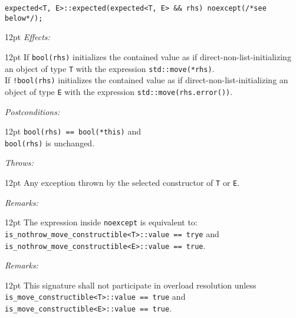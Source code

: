 \documentclass[a4paper,10pt]{article}
\newcommand{\cpp}[1]{\lstinline{#1}}
\newcommand{\wordingItem}[1]{\noindent\textit{#1:}}
\newenvironment{wordingTextItem}[1]{\wordingItem{#1}\vspace{7pt}\noindent\begin{adjustwidth}{12pt}{}}{\vspace{7pt}\end{adjustwidth}}
\newenvironment{wordingPara}{\begin{adjustwidth}{12pt}{}}{\end{adjustwidth}}
\begin{document}
\begin{lstlisting}[xleftmargin=0pt]
expected<T, E>::expected(expected<T, E> && rhs) noexcept(/*see below*/);
\end{lstlisting}
\begin{wordingPara}
\begin{wordingTextItem}{Effects}
If \cpp{bool(rhs)} initializes the contained value as if direct-non-list-initializing an object of type \cpp{T} with the expression \cpp{std::move(*rhs)}. \\

\noindent
If \cpp{!bool(rhs)} initializes the contained value as if direct-non-list-initializing an object of type \cpp{E} with the expression \cpp{std::move(rhs.error())}.
\end{wordingTextItem}
\begin{wordingTextItem}{Postconditions}
\cpp{bool(rhs) == bool(*this)} and \\
\cpp{bool(rhs)} is unchanged.
\end{wordingTextItem}
\begin{wordingTextItem}{Throws}
Any exception thrown by the selected constructor of \cpp{T} or \cpp{E}.
\end{wordingTextItem}
\begin{wordingTextItem}{Remarks}
The expression inside \cpp{noexcept} is equivalent to:\\
\cpp{is_nothrow_move_constructible<T>::value == trye} and   \\
\cpp{is_nothrow_move_constructible<E>::value == true}.
\end{wordingTextItem}
\begin{wordingTextItem}{Remarks}
This signature shall not participate in overload resolution unless\\
\cpp{is_move_constructible<T>::value == true} and \\
\cpp{is_move_constructible<E>::value == true}.
\end{wordingTextItem}
\end{wordingPara}
\end{document}
